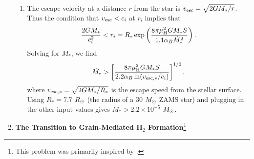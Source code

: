 \begin{enumerate}
\begin{enumerate}
\item The escape velocity at a distance $r$ from the star is $v_{\rm esc} = \sqrt{2 G M_*/r}$. Thus the condition that $v_{\rm esc} < c_i$ at $r_i$ implies that
\begin{displaymath}
\frac{2 G M_*}{c_i^2} <  r_i = R_* \exp\left(\frac{8\pi \mu_{\rm H}^2 G M_* S}{1.1 \alpha_B \dot{M}_*^2}\right).
\end{displaymath}
Solving for $\dot{M}_*$, we find
\begin{displaymath}
\dot{M}_* > \left[\frac{8\pi \mu_{\rm H}^2 G M_* S}{2.2\alpha_B \ln(v_{\rm esc,*}/c_i)}\right]^{1/2},
\end{displaymath}
where $v_{\rm esc,*} = \sqrt{2 G M_*/R_*}$ is the escape speed from the stellar surface. Using $R_*=7.7$ $R_{\odot}$ (the radius of a 30 $M_{\odot}$ ZAMS star) and plugging in the other input values gives $\dot{M}_*>2.2\times 10^{-5}$ $M_{\odot}$.

\end{enumerate}

\item \textbf{The Transition to Grain-Mediated H$_2$ Formation}\footnote{This problem was primarily inspired by \citet{glover03a}.}

\begin{enumerate}


\end{enumerate}
\end{enumerate}

